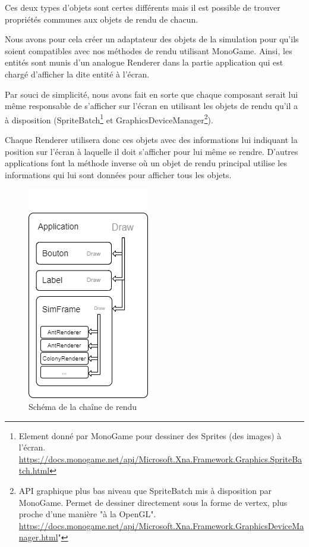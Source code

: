 \documentclass{EPUProjetDi}
\begin{document}
Ces deux types d'objets sont certes différents mais il est possible de trouver propriétés communes aux objets de rendu de chacun.

Nous avons pour cela créer un adaptateur des objets de la simulation pour qu'ils soient compatibles avec nos méthodes de rendu 
utilisant MonoGame. Ainsi, les entités sont munis d'un analogue Renderer dans la partie application qui est chargé d'afficher la dite 
entité à l'écran.

Par souci de simplicité, nous avons fait en sorte que chaque composant serait lui même responsable de s'afficher sur l'écran en utilisant les
objets de rendu qu'il a à disposition (SpriteBatch\footnote{Element donné par MonoGame pour dessiner des Sprites (des images) à l'écran. 
\url{https://docs.monogame.net/api/Microsoft.Xna.Framework.Graphics.SpriteBatch.html}} et GraphicsDeviceManager\footnote{API graphique plus
bas niveau que SpriteBatch mis à disposition par MonoGame. Permet de dessiner directement sous la forme de vertex, plus proche d'une manière "à la 
OpenGL". \url{https://docs.monogame.net/api/Microsoft.Xna.Framework.GraphicsDeviceManager.html}"}).

Chaque Renderer utilisera donc ces objets avec des informations lui indiquant la position sur l'écran à laquelle il doit s'afficher pour
lui même se rendre. D'autres applications font la méthode inverse où un objet de rendu principal utilise les informations qui lui sont 
données pour afficher tous les objets.

\begin{figure}[h]
    \centering
    \includegraphics[scale=0.8]{application_draw.png}
    \caption{Schéma de la chaîne de rendu}
    \label{fig:draw_chain}
\end{figure}
\end{document}
